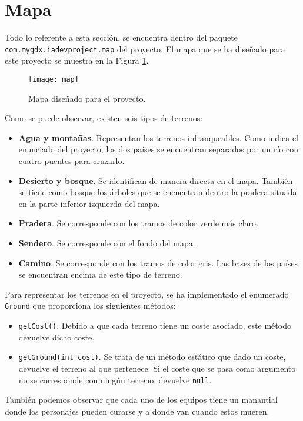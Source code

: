 \medskip
\section{Mapa}
Todo lo referente a esta sección, se encuentra dentro del paquete \texttt{com.mygdx.iadevproject.map} del proyecto. El mapa que se ha diseñado para este proyecto se muestra en la Figura \ref{mapa:mapa}.
\begin{figure}[!th]
\texttt{[image: map]}
\centering
\caption{Mapa diseñado para el proyecto.}
\label{mapa:mapa}
\end{figure}

Como se puede observar, existen seis tipos de terrenos:
\begin{itemize}
 \item \textbf{Agua y montañas}. Representan los terrenos infranqueables. Como indica el enunciado del proyecto, los dos países se encuentran separados por un río con cuatro puentes para cruzarlo.
 \item \textbf{Desierto y bosque}. Se identifican de manera directa en el mapa. También se tiene como bosque los árboles que se encuentran dentro la pradera situada en la parte inferior izquierda del mapa.
 \item \textbf{Pradera}. Se corresponde con los tramos de color verde más claro.
 \item \textbf{Sendero}. Se corresponde con el fondo del mapa.
 \item \textbf{Camino}. Se corresponde con los tramos de color gris. Las bases de los países se encuentran encima de este tipo de terreno.
\end{itemize}

Para representar los terrenos en el proyecto, se ha implementado el enumerado \texttt{Ground} que proporciona los siguientes métodos:
\begin{itemize}
 \item \texttt{getCost()}. Debido a que cada terreno tiene un coste asociado, este método devuelve dicho coste.
 \item \texttt{getGround(int cost)}. Se trata de un método estático que dado un coste, devuelve el terreno al que pertenece. Si el coste que se pasa como argumento no se corresponde con ningún terreno, devuelve \texttt{null}.
\end{itemize}

También podemos observar que cada uno de los equipos tiene un manantial donde los personajes pueden curarse y a donde van cuando estos mueren. \\


